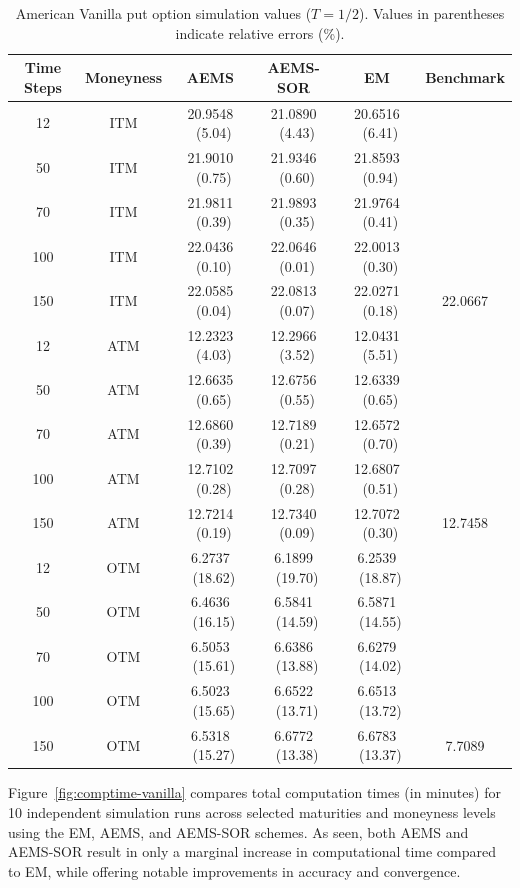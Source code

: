 \documentclass[graybox]{svmult}
\begin{document}
\begin{table}[H]
\centering
\caption{American Vanilla put option simulation values ($T=1/2$). Values in parentheses indicate relative errors (\%).}
\label{tab:SixMonthsVanilla}
\setlength{\tabcolsep}{3.4pt} 
\begin{tabular}{c c c c c c}
\toprule
\textbf{Time Steps} & \textbf{Moneyness} & \textbf{AEMS} & \textbf{AEMS-SOR} & \textbf{EM} & \textbf{Benchmark} \\ 
\midrule
12  & ITM & 20.9548 \ (5.04) & 21.0890 \ (4.43) & 20.6516 \ (6.41) &  \\
50  & ITM & 21.9010 \ (0.75) & 21.9346 \ (0.60) & 21.8593 \ (0.94) \\
70  & ITM & 21.9811 \ (0.39) & 21.9893 \ (0.35) & 21.9764 \ (0.41) \\
100 & ITM & 22.0436 \ (0.10) & 22.0646 \ (0.01) & 22.0013 \ (0.30) &  \\
150 & ITM & 22.0585 \ (0.04) & 22.0813 \ (0.07) & 22.0271 \ (0.18) & 22.0667 \\
\midrule
12  & ATM & 12.2323 \ (4.03) & 12.2966 \ (3.52) & 12.0431 \ (5.51) &  \\
50  & ATM & 12.6635 \ (0.65) & 12.6756 \ (0.55) & 12.6339 \ (0.65) \\
70  & ATM & 12.6860 \ (0.39) & 12.7189 \ (0.21) & 12.6572 \ (0.70) \\
100 & ATM & 12.7102 \ (0.28) & 12.7097 \ (0.28) & 12.6807 \ (0.51) \\
150 & ATM & 12.7214 \ (0.19) & 12.7340 \ (0.09) & 12.7072 \ (0.30) & 12.7458 \\
\midrule
12  & OTM & \phantom{1}6.2737 \ (18.62) & \phantom{1}6.1899 \ (19.70) & \phantom{1}6.2539 \ (18.87) &  \\
50  & OTM & \phantom{1}6.4636 \ (16.15) & \phantom{1}6.5841 \ (14.59) & \phantom{1}6.5871 \ (14.55) \\
70  & OTM & \phantom{1}6.5053 \ (15.61) & \phantom{1}6.6386 \ (13.88) & \phantom{1}6.6279 \ (14.02) \\
100 & OTM & \phantom{1}6.5023 \ (15.65) & \phantom{1}6.6522 \ (13.71) & \phantom{1}6.6513 \ (13.72) \\
150 & OTM & \phantom{1}6.5318 \ (15.27) & \phantom{1}6.6772 \ (13.38) & \phantom{1}6.6783 \ (13.37) & \phantom{1}7.7089 \\
\bottomrule
\end{tabular}
\end{table}


Figure~\ref{fig:comptime-vanilla} compares total computation times (in minutes) for 10 independent simulation runs across selected maturities and moneyness levels using the EM, AEMS, and AEMS-SOR schemes. As seen, both AEMS and AEMS-SOR result in only a marginal increase in computational time compared to EM, while offering notable improvements in accuracy and convergence.
\end{document}
